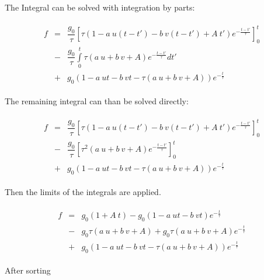 \documentclass[
	pdftex,             %
	12pt,				%
	a4paper,		   	%
	english,				%
	oneside,			%
]{article}
\begin{document}
The Integral can be solved with integration by parts:

\begin{equation}
\begin{split}
\begin{array}{lcll}
f
&=&
\dfrac{g_0}{\tau} 
\left[
\tau
\left( 1 - a~u(t-t') - b~v(t-t') + A~t' \right)
e^{-\tfrac{t-t'}{\tau}}
\right]_0^t
\\
&-&
\dfrac{g_0}{\tau} \int \limits_0^t
\tau
\left( a~u + b~v + A\right) e^{-\tfrac{t-t'}{\tau}} dt'
\\
&+&
g_0 \left( 1 - a~ut - b~vt - \tau \left( a~u + b~v + A \right) \right) e^{-\tfrac{t}{\tau}}
\end{array}
\end{split}
\end{equation}

The remaining integral can than be solved directly:

\begin{equation}
\begin{split}
\begin{array}{lcll}
f
&=&
\dfrac{g_0}{\tau} 
\left[
	\tau
	\left( 1 - a~u(t-t') - b~v(t-t') + A~t' \right)e^{-\tfrac{t-t'}{\tau}}
\right]_0^t
\\
&-&
\dfrac{g_0}{\tau} 
\left[
	\tau^2
	\left( a~u + b~v + A\right) e^{-\tfrac{t-t'}{\tau}} 
\right]_0^t
\\
&+&
g_0 \left( 1 - a~ut - b~vt - \tau \left( a~u + b~v + A \right) \right) e^{-\tfrac{t}{\tau}}
\end{array}
\end{split}
\end{equation}

Then the limits of the integrals are applied.

\begin{equation}
\begin{split}
\begin{array}{lcll}
f
&=&
g_0 \left( 1 + A~t \right)
-
g_0 \left( 1 - a~ut - b~vt \right)e^{-\tfrac{t}{\tau}}
\\
&-&
g_0 \tau (a~u + b~v + A)
+
g_0 \tau (a~u + b~v + A) e^{-\tfrac{t}{\tau}}
\\
&+& g_0 \left( 1 - a~ut - b~vt - \tau \left( a~u + b~v + A \right) \right) e^{-\tfrac{t}{\tau}}
\end{array}
\end{split}
\end{equation}

After sorting
\end{document}
